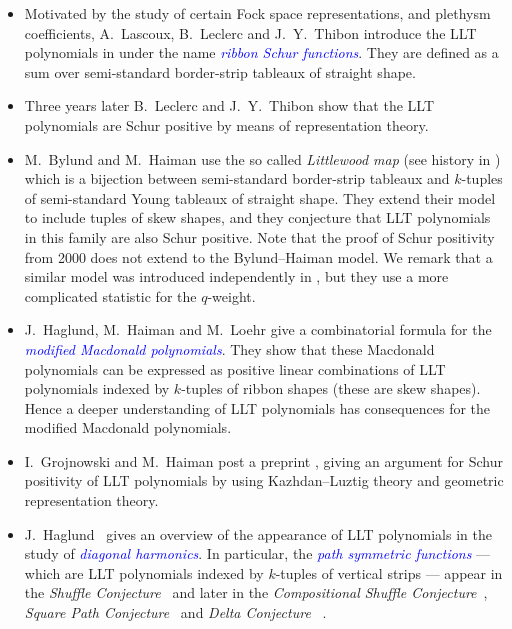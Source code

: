 \documentclass[reqno]{amsart}
\newcommand{\defin}[1]{\textcolor{blue}{\emph{#1}}}
\begin{document}
\begin{itemize}
 \item[(1997)] Motivated by the study of certain Fock space representations,
 and plethysm coefficients, A.~Lascoux, B.~Leclerc and J.~Y.~Thibon 
 introduce the LLT polynomials in \cite{Lascoux97ribbontableaux} 
 under the name \defin{ribbon Schur functions}.
 They are defined as a sum over semi-standard border-strip tableaux
 of straight shape.
 \item[(2000)] Three years later B.~Leclerc and J.~Y.~Thibon \cite{LeclercThibon2000}
 show that the LLT polynomials are Schur positive by means of representation theory.
 
 \item[(2000+)] M.~Bylund and M.~Haiman  use the so called \emph{Littlewood map} (see history in \cite[p.~92]{qtCatalanBook})
 which is a bijection between semi-standard border-strip tableaux
 and $k$-tuples of semi-standard Young tableaux of straight shape.
 They extend their model to include tuples of skew shapes,
 and they conjecture that LLT polynomials in this family are also Schur positive. 
 Note that the proof of Schur positivity from 2000 does not extend to the Bylund--Haiman model.
 We remark that a similar model was introduced independently 
 in \cite{SchillingShimozonoWhite2003}, but 
 they use a more complicated statistic for the $q$-weight.

 \item[(2005)] J.~Haglund, M.~Haiman and M.~Loehr \cite{HaglundHaimanLoehr2005}
 give a combinatorial formula for the \defin{modified Macdonald polynomials}.
 They show that these Macdonald polynomials can be expressed as positive linear combinations
 of LLT polynomials indexed by $k$-tuples of ribbon shapes (these are skew shapes).
 Hence a deeper understanding of LLT polynomials has consequences for the modified Macdonald polynomials.
 
 \item[(2006)] I.~Grojnowski and M.~Haiman post a preprint \cite{GrojnowskiHaiman2006},
 giving an argument for Schur positivity of LLT polynomials by using Kazhdan--Luztig theory
 and  geometric representation theory.
 
 \item[(2007+)] J.~Haglund~\cite[Ch.~6]{qtCatalanBook}
 gives an overview of the appearance of LLT polynomials in 
 the study of \defin{diagonal harmonics}.
 In particular, the \defin{path symmetric functions} ---
 which are LLT polynomials indexed by $k$-tuples of vertical strips ---
 appear in the \emph{Shuffle Conjecture}~\cite{HaglundHaimanLoehrRemmelUlyanov2005} and later in the 
 \emph{Compositional Shuffle Conjecture}~\cite{HaglundMorseZabrocki2012},
 \emph{Square Path Conjecture}~\cite{Sergel2017} and 
 \emph{Delta Conjecture}~\cite{HaglundRemmelWilson2018} .
 

\end{itemize}
\end{document}
